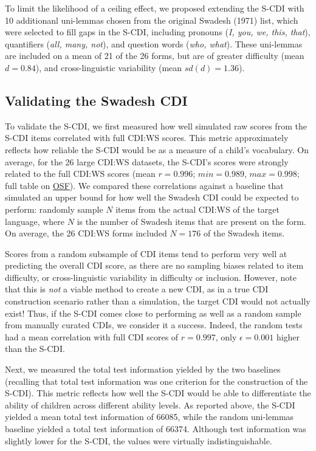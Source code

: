 \documentclass[10pt, letterpaper]{article}
\begin{document}
To limit the likelihood of a ceiling effect, we proposed extending the
S-CDI with 10 additionanl uni-lemmas chosen from the original Swadesh
(1971) list, which were selected to fill gaps in the S-CDI, including
pronouns (\emph{I, you, we, this, that}), quantifiers (\emph{all, many,
not}), and question words (\emph{who, what}). These uni-lemmas are
included on a mean of 21 of the 26 forms, but are of greater difficulty
(mean \(d=0.84\)), and cross-linguistic variability (mean
\(sd(d)=1.36\)).

\hypertarget{validating-the-swadesh-cdi}{%
\subsection{Validating the Swadesh
CDI}\label{validating-the-swadesh-cdi}}

To validate the S-CDI, we first measured how well simulated raw scores
from the S-CDI items correlated with full CDI:WS scores. This metric
approximately reflects how reliable the S-CDI would be as a measure of a
child's vocabulary. On average, for the 26 large CDI:WS datasets, the
S-CDI's scores were strongly related to the full CDI:WS scores (mean
\(r=0.996\); \(min=0.989\), \(max=0.998\); full table on
\href{https://osf.io/8swhb/?view_only=6f6ab9818f2a4bb288e05ca9e12f540c}{OSF}).
We compared these correlations against a baseline that simulated an
upper bound for how well the Swadesh CDI could be expected to perform:
randomly sample \(N\) items from the actual CDI:WS of the target
language, where \(N\) is the number of Swadesh items that are present on
the form. On average, the 26 CDI:WS forms included \(N=176\) of the
Swadesh items.

Scores from a random subsample of CDI items tend to perform very well at
predicting the overall CDI score, as there are no sampling biases
related to item difficulty, or cross-linguistic variability in
difficulty or inclusion. However, note that this is \emph{not} a viable
method to create a new CDI, as in a true CDI construction scenario
rather than a simulation, the target CDI would not actually exist! Thus,
if the S-CDI comes close to performing as well as a random sample from
manually curated CDIs, we consider it a success. Indeed, the random
tests had a mean correlation with full CDI scores of \(r=0.997\), only
\(\epsilon=0.001\) higher than the S-CDI.

Next, we measured the total test information yielded by the two
baselines (recalling that total test information was one criterion for
the construction of the S-CDI). This metric reflects how well the S-CDI
would be able to differentiate the ability of children across different
ability levels. As reported above, the S-CDI yielded a mean total test
information of 66085, while the random uni-lemmas baseline yielded a
total test information of 66374. Although test information was slightly
lower for the S-CDI, the values were virtually indistinguishable.
\end{document}
